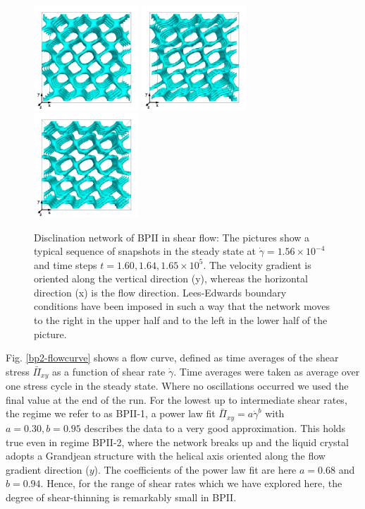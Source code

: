 \documentclass[8.5pt,twoside,twocolumn]{article}
\newcommand{\e}[1]{\times10^{#1}}
\newcommand{\gd}{\dot{\gamma}}
\begin{document}
\begin{figure}[htpb]
\center
\includegraphics[width=0.35\textwidth]{disc-160k_run902r.png}
\includegraphics[width=0.35\textwidth]{disc-164k_run902r.png}
\includegraphics[width=0.35\textwidth]{disc-165k_run902r.png}
\caption{Disclination network of BPII in shear flow: 
The pictures show a typical sequence of snapshots in the steady state 
at $\gd=1.56\e{-4}$ and time steps $t=1.60, 1.64,1.65\e{5}$. The velocity 
gradient is oriented along the vertical direction (y), whereas the 
horizontal direction (x) is the flow direction. Lees-Edwards boundary 
conditions have been imposed in such a way that the network moves to the 
right in the upper half and to the left in the lower half of the picture.}
\label{bp2-1-disc}
\end{figure}

Fig. \ref{bp2-flowcurve} shows a flow curve, defined as time averages of 
the shear stress $\bar{\Pi}_{xy}$ as a function of shear rate $\gd$.
Time averages were taken as average over one stress cycle in the steady state.
Where no oscillations occurred we used the final value at the end of the run.
For the lowest up to intermediate shear rates, the regime we refer to as BPII-1, a 
power law fit $\bar{\Pi}_{xy}=a \gd^b$ with $a=0.30, b=0.95$ describes 
the data to a very good approximation.
This holds true even in regime BPII-2, where the network breaks up and 
the liquid crystal adopts a Grandjean structure with the helical axis oriented along the
flow gradient direction ($y$). The coefficients of the power law fit are
here $a=0.68$ and $b=0.94$. Hence, for the range of shear rates which we have explored here, 
the degree of shear-thinning is remarkably small in BPII.
\end{document}
